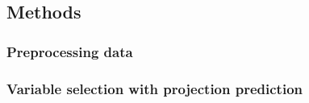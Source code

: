 



\subsection{Methods}

\subsubsection{Preprocessing data}

\subsubsection{Variable selection with projection prediction}

